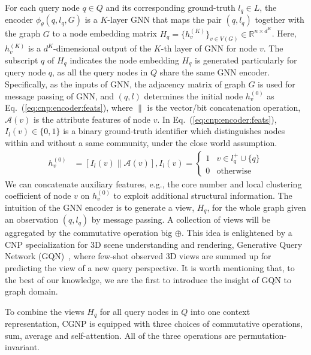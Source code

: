  For each query node $q \in Q$ and its corresponding ground-truth $l_q \in L$, the encoder $\phi_{\theta}(q, l_q, G)$ is a $K$-layer GNN that maps the pair $(q, l_q)$ together with the graph $G$ to a node embedding matrix $H_q = \{ h_{v}^{(K)}\}_{v \in V(G)} \in \mathbb{R}^{n \times d^K}$. 
Here, $h_{v}^{(K)}$ is a $d^K$-dimensional output of the $K$-th layer of GNN for node $v$. 
The subscript $q$ of $H_q$ indicates the node embedding $H_q$ is generated particularly for query node $q$, as all the query nodes in $Q$ share the same GNN encoder.
Specifically, as the inputs of GNN, the adjacency matrix of graph $G$ is used for message passing of GNN, and $(q, l)$ determines the initial node $h_v^{(0)}$ as Eq.~(\ref{eq:cnp:encoder:feats}), where $\|$ is the vector/bit concatenation operation, $\mathcal{A}(v)$ is the attribute features of node $v$. In Eq.~(\ref{eq:cnp:encoder:feats}), $I_l(v) \in \{0, 1\}$ is a binary ground-truth identifier which distinguishes nodes within and without a same community, under the close world assumption. 
\begin{align}
	\label{eq:cnp:encoder:feats}
	h_v^{(0)} &= [ I_l(v) \| \mathcal{A}(v) ],
	I_l(v) =
	\begin{cases}
		1 & {v \in l_q^{+} \cup \{q\}  }  \\
		0 & \text{otherwise}
	\end{cases}
\end{align}
%
We can concatenate auxiliary features, e.g., the core number and local clustering coefficient of node $v$ on $h_v^{(0)}$ to exploit additional structural information.
The intuition of the GNN encoder is to generate a view, $H_q$, for the whole graph given an observation $(q, l_q)$ by message passing. 
A collection of views will be aggregated by the commutative operation big $\oplus$. This idea is enlightened by a CNP specialization for 3D scene understanding and rendering, Generative Query Network (GQN)~\cite{GQN}, where few-shot observed 3D views are summed up for predicting the view of a new query perspective. It is worth mentioning that, to the best of our knowledge, we are the first to introduce the insight of GQN to graph domain. 

 To combine the views $H_q$ for all query nodes in $ Q$ into one context representation, CGNP is equipped with three choices of commutative operations, sum, average and self-attention. All of the three operations are permutation-invariant. 

